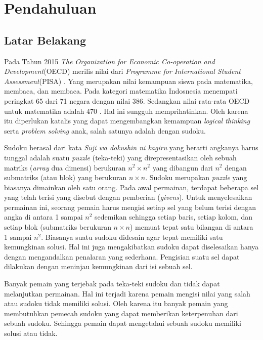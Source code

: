 \chapter{Pendahuluan}

\section{Latar Belakang}

Pada Tahun 2015 \textit{The Organization for Economic Co-operation and Development}(OECD) merilis nilai dari \textit{Programme for International Student Assessment}(PISA) \cite{Pisa1}. Yang merupakan nilai kemampuan siswa pada matematika, membaca, dan membaca. Pada kategori matematika Indosnesia menempati peringkat 65 dari 71 negara dengan nilai 386. Sedangkan nilai rata-rata OECD untuk matematika adalah 470 \cite{Pisa2}. Hal ini sungguh memprihatinkan. Oleh karena itu diperlukan katalis yang dapat mengembangkan kemampuan \textit{logical thinking} serta \textit{problem solving} anak, salah satunya adalah dengan sudoku. 

Sudoku berasal dari kata \textit{Sūji wa dokushin ni kagiru} yang berarti angkanya harus tunggal \cite{SATPy3} adalah suatu \textit{puzzle} (teka-teki) yang direpresentasikan oleh sebuah matriks (\textit{array}
dua dimensi) berukuran ${n^2 \times n^2}$  yang dibangun dari ${n^2}$ dengan submatriks (atau blok)
yang berukuran ${n \times n}$. Sudoku merupakan \textit{puzzle}
yang biasanya dimainkan oleh satu orang.  Pada
awal permainan, terdapat beberapa sel yang telah terisi yang disebut dengan pemberian
(\textit{givens}). Untuk menyelesaikan permainan ini, seorang pemain harus mengisi setiap sel yang
belum terisi dengan angka di antara 1 sampai
$n^2$ sedemikan sehingga setiap baris, setiap kolom,
dan setiap blok (submatriks berukuran $n \times n$) memuat tepat satu bilangan di antara 1 sampai $n^2$. Biasanya suatu sudoku didesain agar tepat memiliki satu kemungkinan solusi. Hal
ini juga mengakibatkan sudoku dapat diselesaikan hanya dengan mengandalkan penalaran
yang sederhana. Pengisian suatu sel dapat dilakukan dengan meninjau kemungkinan dari
isi sebuah sel.

Banyak pemain yang terjebak pada teka-teki sudoku dan tidak dapat melanjutkan permainan. Hal ini terjadi karena pemain mengisi nilai yang salah atau sudoku tidak memiliki solusi. Oleh karena itu banyak pemain yang membutuhkan pemecah sudoku yang dapat memberikan keterpenuhan dari sebuah sudoku. Sehingga pemain dapat mengetahui sebuah sudoku memiliki solusi atau tidak.

